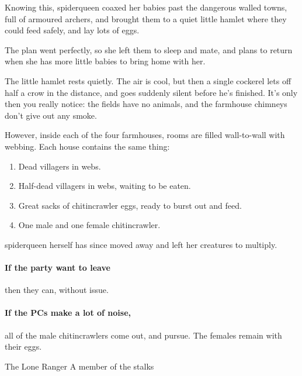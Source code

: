 \begin{multicols}{2}
Knowing this, \gls{spiderqueen} coaxed her babies past the dangerous walled towns, full of armoured archers, and brought them to a quiet little hamlet where they could feed safely, and lay lots of eggs.

The plan went perfectly, so she left them to sleep and mate, and plans to return when she has more little babies to bring home with her.

\begin{boxtext}

  The little hamlet rests quietly.
  The air is cool, but then a single cockerel lets off half a crow in the distance, and goes suddenly silent before he's finished.
  It's only then you really notice: the fields have no animals, and the farmhouse chimneys don't give out any smoke.

\end{boxtext}

However, inside each of the four farmhouses, rooms are filled wall-to-wall with webbing.  Each house contains the same thing:

\begin{enumerate}
  \item
  Dead villagers in webs.
  \item
  Half-dead villagers in webs, waiting to be eaten.
  \item
  Great sacks of chitincrawler eggs, ready to burst out and feed.
  \item
  One male and one female chitincrawler.
\end{enumerate}

\Gls{spiderqueen} herself has since moved away and left her creatures to multiply.

\paragraph{If the party want to leave}
then they can, without issue.

\paragraph{If the PCs make a lot of noise,}
all of the male chitincrawlers come out, and pursue.
The females remain with their eggs.



{The Lone Ranger}%
{A member of the  stalks }%


\end{multicols}

